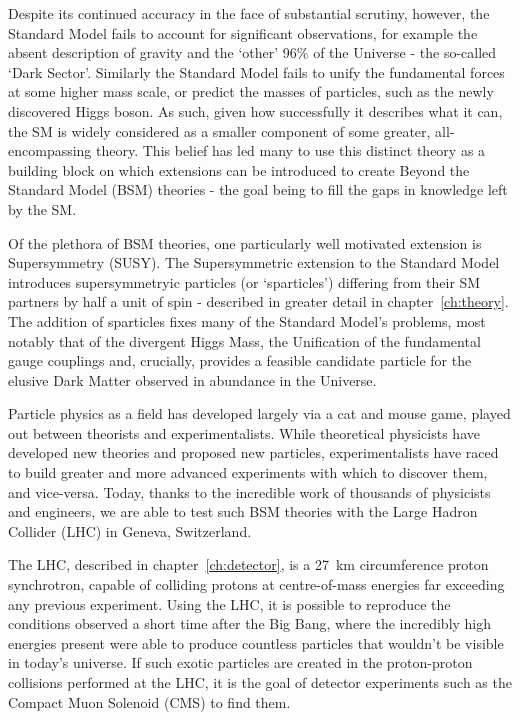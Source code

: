 Despite its continued accuracy in the face of substantial scrutiny, however,
the Standard Model fails to account for significant observations, for example
the absent description of gravity and the `other' 96\% of the
Universe - the so-called `Dark Sector'. Similarly the Standard Model fails to
unify the fundamental forces at some higher mass scale, or predict the masses of
particles, such as
the newly discovered Higgs boson. As such, given how successfully it describes
what it can, the SM is widely considered as a smaller component of some greater,
all-encompassing theory. This belief has led many to use this distinct theory as
a building block on which extensions can be introduced to create Beyond the
Standard Model (BSM) theories - the goal being to fill the gaps in knowledge
left by the SM.

Of the plethora of BSM theories, one particularly well motivated extension is
Supersymmetry (SUSY). The Supersymmetric extension to the Standard
Model introduces supersymmetryic particles (or `sparticles') differing from
their SM partners by half a unit of spin - described in greater detail in
chapter~\ref{ch:theory}. The addition of sparticles fixes
many of the Standard Model's problems, most notably that of the
divergent Higgs Mass, the Unification of the fundamental gauge couplings and,
crucially, provides a feasible candidate particle for the elusive Dark Matter
observed in abundance in the Universe.

Particle physics as a field has developed largely via a cat and mouse game,
played out between theorists and experimentalists. While theoretical physicists
have developed new theories and proposed new particles, experimentalists have
raced to build greater and more advanced experiments with which to discover
them, and vice-versa.
Today, thanks to the incredible work of thousands of physicists and
engineers, we are able to test such BSM theories with the Large
Hadron Collider (LHC) in Geneva, Switzerland.

The LHC, described in chapter~\ref{ch:detector}, is a 27~km
circumference proton synchrotron, capable of colliding protons
at centre-of-mass energies far exceeding any previous experiment.
Using the LHC, it is possible to reproduce the conditions observed a short time
after the Big Bang, where the incredibly high energies present were able to
produce countless particles that wouldn't be visible in today's universe. If
such exotic particles are created in the proton-proton collisions performed at
the LHC, it is the goal of detector experiments such as the Compact Muon
Solenoid (CMS) to find them.

